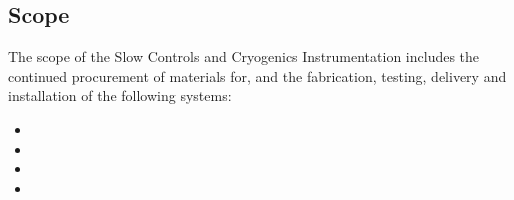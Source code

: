 \subsection{Scope}
\label{sec:fdsp-slow-cryo-scope}

The scope of the Slow Controls and Cryogenics Instrumentation includes the continued procurement of materials for, and the fabrication, testing, delivery and installation of the following systems: 


\begin{itemize}
\item 
\item 
\item  
\item 
\end{itemize}

